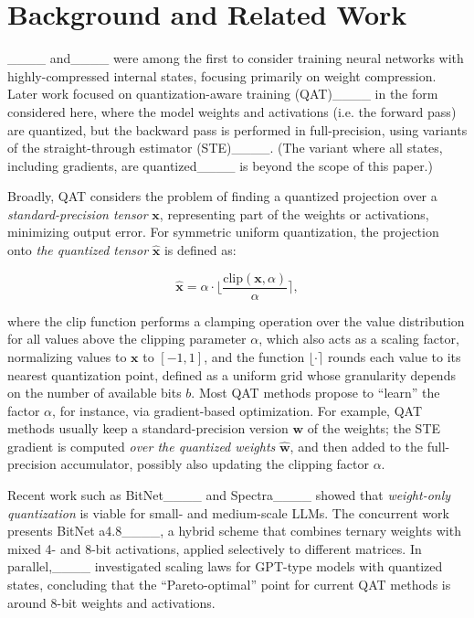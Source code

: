 \section{Background and Related Work}
\label{sec:background}

____ and____ were among the first to consider training neural networks with highly-compressed internal states, focusing primarily on weight compression. 
Later work focused on quantization-aware training (QAT)____ in the form considered here, where the model weights and activations (i.e. the forward pass) are quantized, but the backward pass is performed in full-precision, using variants of the straight-through estimator (STE)____. (The variant where all states, including gradients, are quantized____ is beyond the scope of this paper.) 


Broadly, QAT considers the problem of finding a quantized projection over a \emph{standard-precision tensor} $\mathbf{x}$, representing part of the weights or activations, minimizing output error. For symmetric uniform quantization, the projection onto \emph{the quantized tensor} $\hat{\mathbf{x}}$ is defined as:  

\begin{equation}
\hat{\mathbf{x}} = \alpha \cdot \biggl\lfloor\frac{\text{clip}(\mathbf{x}, \alpha)}{\alpha}\biggr\rceil,
\label{eqn:quant}
\end{equation}

\noindent where the $\text{clip}$ function performs a clamping operation over the value distribution for all values above the clipping parameter $\alpha$, which also acts as a scaling factor, normalizing values to $\mathbf{x}$ to $[-1, 1]$, and the function $\lfloor \cdot \rceil$ rounds each value to its nearest quantization point, defined as a uniform grid whose granularity depends on the number of available bits $b$. Most QAT methods propose to ``learn'' the factor $\alpha$, for instance, via gradient-based optimization. 
For example, QAT methods usually keep a standard-precision version $\mathbf{w}$ of the weights; the STE gradient is computed \emph{over the quantized weights} $\widehat{\mathbf{w}}$, and then added to the full-precision accumulator, possibly also updating the clipping factor $\alpha$. 

Recent work such as BitNet____ and Spectra____ showed that \emph{weight-only quantization} is viable for small- and medium-scale LLMs. The concurrent work presents BitNet a4.8____, a hybrid scheme that combines ternary weights with mixed 4- and 8-bit activations, applied selectively to different matrices. 
In parallel,____ investigated scaling laws for GPT-type models with quantized states, concluding that the ``Pareto-optimal'' point for current QAT methods is around 8-bit weights and activations.


